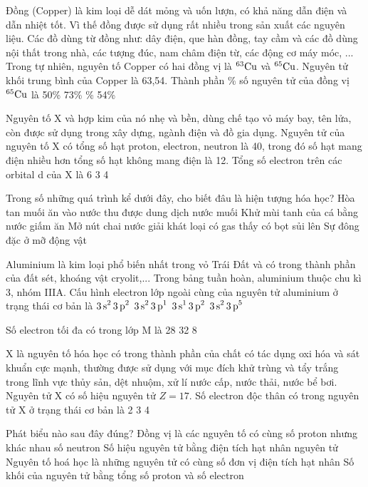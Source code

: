 \documentclass[11pt,a4paper]{article}
\begin{document}
\begin{ex}
Đồng (Copper) là kim loại dễ dát mỏng và uốn lượn, có khả năng dẫn điện và dẫn nhiệt tốt. Vì thế đồng được sử dụng rất nhiều trong sản xuất các nguyên liệu. Các đồ dùng từ đồng như: dây điện, que hàn đồng, tay cầm và các đồ dùng nội thất trong nhà, các tượng đúc, nam châm điện từ, các động cơ máy móc, ... Trong tự nhiên, nguyên tố Copper có hai đồng vị là $^{63}\ce{Cu}$ và $^{65}\ce{Cu}$. Nguyên tử khối trung bình của Copper là 63,54. Thành phần \% số nguyên tử của đồng vị $^{65}\ce{Cu}$ là
\choice
{50\%}
{73\%}
{\%}
{54\%}
\end{ex}
\begin{ex}
Nguyên tố X và hợp kim của nó nhẹ và bền, dùng chế tạo vỏ máy bay, tên lửa, còn được sử dụng trong xây dựng, ngành điện và đồ gia dụng. Nguyên tử của nguyên tố X có tổng số hạt proton, electron, neutron là 40, trong đó số hạt mang điện nhiều hơn tổng số hạt không mang điện là 12. Tổng số electron trên các orbital d của X là
\choice
{}
{6}
{3}
{4}
\end{ex}
\begin{ex}
Trong số những quá trình kể dưới đây, cho biết đâu là hiện tượng hóa học?
\choice
{Hòa tan muối ăn vào nước thu được dung dịch nước muối}
{\True Khử mùi tanh của cá bằng nước giấm ăn}
{Mở nút chai nước giải khát loại có gas thấy có bọt sủi lên}
{Sự đông đặc ở mỡ động vật}
\end{ex}
\begin{ex}
Aluminium là kim loại phổ biến nhất trong vỏ Trái Đất và có trong thành phần của đất sét, khoáng vật cryolit,... Trong bảng tuần hoàn, aluminium thuộc chu kì 3, nhóm IIIA. Cấu hình electron lớp ngoài cùng của nguyên tử aluminium ở trạng thái cơ bản là
\choice
{$\ce{3s^2 3p^2}$}
{\True $\ce{3s^2 3p^1}$}
{$\ce{3s^1 3p^2}$}
{$\ce{3s^2 3p^5}$}
\end{ex}
\begin{ex}
Số electron tối đa có trong lớp M là
\choice
{}
{28}
{32}
{8}
\end{ex}
\begin{ex}
X là nguyên tố hóa học có trong thành phần của chất có tác dụng oxi hóa và sát khuẩn cực mạnh, thường được sử dụng với mục đích khử trùng và tẩy trắng trong lĩnh vực thủy sản, dệt nhuộm, xử lí nước cấp, nước thải, nước bể bơi. Nguyên tử X có số hiệu nguyên tử $Z = 17$. Số electron độc thân có trong nguyên tử X ở trạng thái cơ bản là
\choice
{}
{2}
{3}
{4}
\end{ex}
\begin{ex}
Phát biểu nào sau đây đúng?
\choice
{Đồng vị là các nguyên tố có cùng số proton nhưng khác nhau số neutron}
{Số hiệu nguyên tử bằng điện tích hạt nhân nguyên tử}
{\True Nguyên tố hoá học là những nguyên tử có cùng số đơn vị điện tích hạt nhân}
{Số khối của nguyên tử bằng tổng số proton và số electron}
\end{ex}
\end{document}
